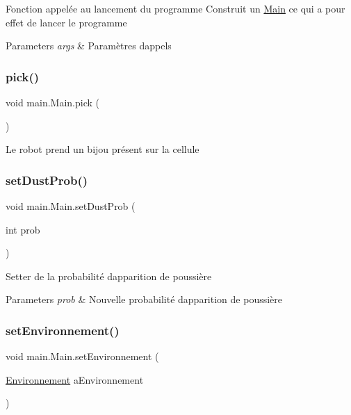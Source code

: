 Fonction appelée au lancement du programme Construit un \hyperlink{classmain_1_1_main}{Main} ce qui a pour effet de lancer le programme 
\begin{DoxyParams}{Parameters}
{\em args} & Paramètres d\textquotesingle{}appels \\
\hline
\end{DoxyParams}
\hypertarget{classmain_1_1_main_a007a1feb59e43e37f32b6d8625664986}{}\label{classmain_1_1_main_a007a1feb59e43e37f32b6d8625664986} 
\subsubsection{\texorpdfstring{pick()}{pick()}}
{\footnotesize\ttfamily void main.\+Main.\+pick (\begin{DoxyParamCaption}{ }\end{DoxyParamCaption})}

Le robot prend un bijou présent sur la cellule \hypertarget{classmain_1_1_main_a4fe27a92bfb4ab6b91100b78d5e60984}{}\label{classmain_1_1_main_a4fe27a92bfb4ab6b91100b78d5e60984} 
\subsubsection{\texorpdfstring{set\+Dust\+Prob()}{setDustProb()}}
{\footnotesize\ttfamily void main.\+Main.\+set\+Dust\+Prob (\begin{DoxyParamCaption}\item[{int}]{prob }\end{DoxyParamCaption})}

Setter de la probabilité d\textquotesingle{}apparition de poussière 
\begin{DoxyParams}{Parameters}
{\em prob} & Nouvelle probabilité d\textquotesingle{}apparition de poussière \\
\hline
\end{DoxyParams}
\hypertarget{classmain_1_1_main_aaf5877a75af1ae2d8f6e35ce6d624301}{}\label{classmain_1_1_main_aaf5877a75af1ae2d8f6e35ce6d624301} 
\subsubsection{\texorpdfstring{set\+Environnement()}{setEnvironnement()}}
{\footnotesize\ttfamily void main.\+Main.\+set\+Environnement (\begin{DoxyParamCaption}\item[{\hyperlink{classenvironnement_1_1_environnement}{Environnement}}]{a\+Environnement }\end{DoxyParamCaption})}

